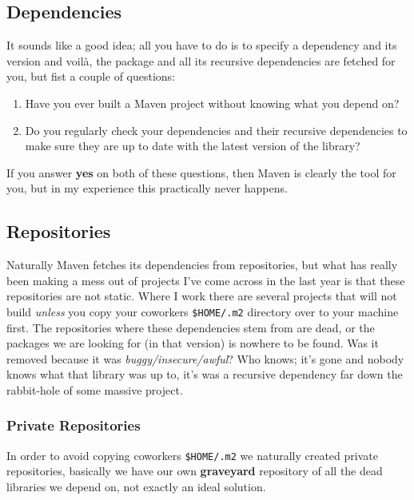\subsection{ Dependencies }

It sounds like a good idea; all you have to do is to specify a dependency
and its version and voilà, the package and all its recursive dependencies are
fetched for you, but fist a couple of questions:

\begin{enumerate}

\item{ Have you ever built a Maven project without knowing what you depend on?}

\item{ Do you regularly check your dependencies and their recursive dependencies to make sure they are up to date with the latest version of the library?}

\end{enumerate}


If you answer \textbf{yes} on both of these questions, then Maven is clearly
the tool for you, but in my experience this practically never happens.



\subsection{ Repositories }

Naturally Maven fetches its dependencies from repositories, but what has
really been making a mess out of projects I've come across in the last year
is that these repositories are not static. Where I work there are several
projects that will not build \textit{unless} you copy your coworkers
\texttt{\$HOME/.m2} directory over to your machine first. The repositories where
these dependencies stem from are dead, or the packages we are looking for
(in that version) is nowhere to be found. Was it removed because
it was \textit{buggy/insecure/awful}? Who knows; it's gone and nobody knows what
that library was up to, it's was a recursive dependency far down the
rabbit-hole of some massive project.



\subsubsection{ Private Repositories }

In order to avoid copying coworkers \texttt{\$HOME/.m2} we naturally created
private repositories, basically we have our own \textbf{graveyard} repository of
all the dead libraries we depend on, not exactly an ideal solution.



